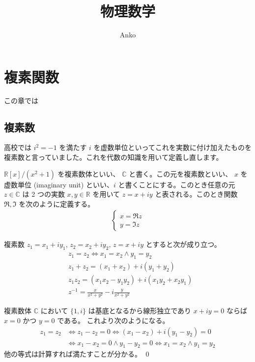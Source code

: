 \documentclass[uplatex,dvipdfmx,a4paper,11pt]{jlreq}
\title{物理数学}
\author{Anko}
\makeatletter
\newcommand{\CC}{\mathbb{C}}
\newcommand{\RR}{\mathbb{R}}
\theoremstyle{definition}
\renewenvironment{proof}[1][\proofname]{\par
  \normalfont
  \topsep6\p@\@plus6\p@ \trivlist
  \item[\hskip\labelsep{\bfseries #1}\@addpunct{\bfseries}]\ignorespaces\quad\par
}{%
  \qed\endtrivlist\@endpefalse
}
\renewcommand\proofname{証明}
\makeatother
\begin{document}
\maketitle

\section{複素関数}
この章では
\subsection{複素数}
高校では $i^2 = -1$ を満たす $i$ を虚数単位といってこれを実数に付け加えたものを複素数と言っていました。これを代数の知識を用いて定義し直します。

\begin{definition}
  $\RR[x]/(x^2 + 1)$ を複素数体といい、 $\CC$ と書く。この元を複素数といい、 $x$ を虚数単位 (imaginary unit) といい、$i$ と書くことにする。このとき任意の元 $z\in\CC$ は 2 つの実数 $x, y\in\RR$ を用いて $z = x + iy$ と表される。このとき関数 $\Re, \Im$ を次のように定義する。
  \begin{align}
    \begin{cases}
      x = \Re z \\
      y = \Im z
    \end{cases}
  \end{align}
\end{definition}

\begin{proposition}
  複素数 $z_1 = x_1 + iy_1$, $z_2 = x_2 + iy_2$, $z = x + iy$ とすると次が成り立つ。
  \begin{align}
     & z_1 = z_2 \iff x_1 = x_2 \land y_1 = y_2            \\
     & z_1 + z_2 = (x_1 + x_2) + i(y_1 + y_2)              \\
     & z_1z_2 = (x_1x_2 - y_1y_2) + i(x_1y_2 + x_2y_1)     \\
     & z^{-1} = \frac{x}{x^2 + y^2} - i\frac{y}{x^2 + y^2}
  \end{align}
\end{proposition}
\begin{proof}
  複素数体 $\CC$ において $\lbrace 1, i\rbrace$ は基底となるから線形独立であり $x + iy = 0$ ならば $x = 0$ かつ $y = 0$ である。
  これより次のようになる。
  \begin{align}
    z_1 = z_2 & \iff z_1 - z_2 = 0 \iff (x_1 - x_2) + i(y_1 - y_2) = 0                \\
              & \iff x_1 - x_2 = 0 \land y_1 - y_2 = 0 \iff x_1 = x_2 \land y_1 = y_2
  \end{align}
  他の等式は計算すれば満たすことが分かる。
\end{proof}
\end{document}
